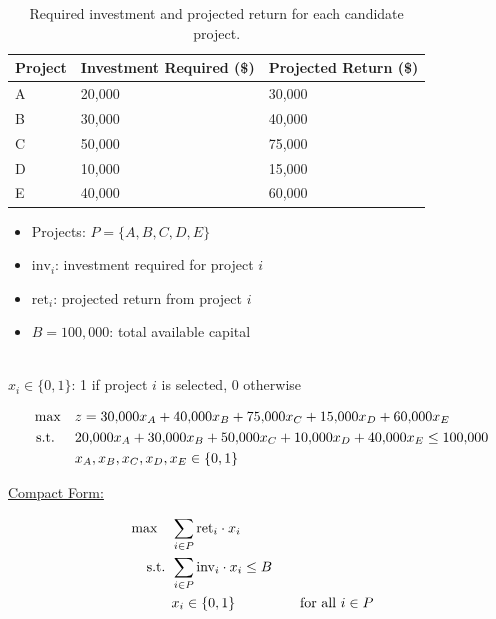 \begin{table}[h!] \begin{center} \begin{tabular} {|l|l|l|} 
\hline Project & Investment Required (\$) & Projected Return (\$)  \\ \hline
\hline  A & 20,000 & 30,000  \\
\hline  B & 30,000 & 40,000  \\
\hline  C & 50,000 & 75,000  \\
\hline  D & 10,000 & 15,000  \\
\hline  E & 40,000 & 60,000  \\
\hline \end{tabular} \end{center} \caption{Required investment and projected return for each candidate project.}\label{tab:modeling-linear-programming-tab05}%
\end{table}

\begin{solution}

\smallskip {}
\begin{itemize}
\item Projects: \( P = \{A, B, C, D, E\} \)
\end{itemize}

\smallskip {}
\begin{itemize}
\item \( \text{inv}_i \): investment required for project \( i \)
\item \( \text{ret}_i \): projected return from project \( i \)
\item \( B = 100{,}000 \): total available capital
\end{itemize}

\smallskip {} \\
\( x_i \in \{0,1\} \): 1 if project \( i \) is selected, 0 otherwise

\smallskip {}
\begin{align*}
\max \quad & z = 30{,}000x_A + 40{,}000x_B + 75{,}000x_C + 15{,}000x_D + 60{,}000x_E \\
\text{ s.t. } \quad 
& 20{,}000x_A + 30{,}000x_B + 50{,}000x_C + 10{,}000x_D + 40{,}000x_E \le 100{,}000 \\
& x_A, x_B, x_C, x_D, x_E \in \{0,1\}
\end{align*}

\smallskip \underline{Compact Form:}

\begin{align*}
\max \quad & \sum_{i \in P} \text{ret}_i \cdot x_i \\
\text{ s.t. }        & \sum_{i \in P} \text{inv}_i \cdot x_i \le B \\
& x_i \in \{0,1\} &&\quad \text{for all } i \in P
\end{align*}

\end{solution}

